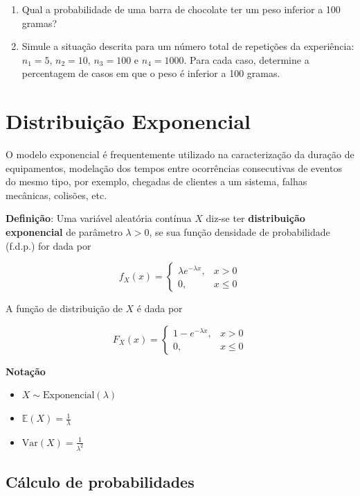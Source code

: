 \documentclass[
]{book}
\providecommand{\tightlist}{%
  \setlength{\itemsep}{0pt}\setlength{\parskip}{0pt}}
\begin{document}
\begin{enumerate}
\def\labelenumi{(\alph{enumi})}
\item
  Qual a probabilidade de uma barra de chocolate ter um peso inferior
  a 100 gramas?
\item
  Simule a situação descrita para um número total de repetições da
  experiência: \(n_1=5\), \(n_2=10\), \(n_3=100\) e \(n_4=1000\). Para cada
  caso, determine a percentagem de casos em que o peso é inferior a
  100 gramas.
\end{enumerate}

\section{Distribuição Exponencial}\label{distribuiuxe7uxe3o-exponencial}

O modelo exponencial é frequentemente utilizado na caracterização da duração de equipamentos, modelação dos tempos entre ocorrências consecutivas de eventos do mesmo tipo, por exemplo, chegadas de clientes a um sistema, falhas mecânicas, colisões, etc.

\textbf{Definição}: Uma variável aleatória contínua \(X\) diz-se ter \textbf{distribuição exponencial} de parâmetro \(\lambda > 0\), se sua função densidade de probabilidade (f.d.p.) for dada por

\[
f_X(x) = 
\begin{cases}
\lambda e^{-\lambda x}, & x > 0 \\
0, & x \leq 0
\end{cases}
\]

A função de distribuição de \(X\) é dada por

\[
F_X(x) = 
\begin{cases}
1 - e^{-\lambda x}, & x > 0 \\
0, & x \leq 0
\end{cases}
\]

\textbf{Notação}

\begin{itemize}
\tightlist
\item
  \(X \sim \text{Exponencial}(\lambda)\)
\item
  \(\mathbb{E}(X) = \frac{1}{\lambda}\)
\item
  \(\text{Var}(X) = \frac{1}{\lambda^2}\)
\end{itemize}

\subsection{Cálculo de probabilidades}\label{cuxe1lculo-de-probabilidades-4}
\end{document}
